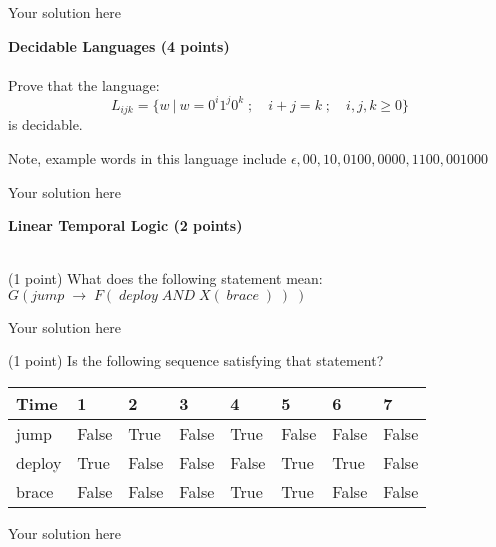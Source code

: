 \documentclass[12pt]{article}
\newenvironment{question}[2][Question]{\begin{trivlist}
\item[\hskip \labelsep {\bfseries #1}\hskip \labelsep {\bfseries #2.}]}{\end{trivlist}}
\newenvironment{solution}[1][Solution:]{\begin{trivlist}
\item[\hskip \labelsep {\bfseries #1}\hskip \labelsep {\bfseries}]\color{blue}}{\end{trivlist}}
\begin{document}
  \begin{solution}
 \;
 
 Your solution here
  \end{solution}

\clearpage
\begin{question}{10}\textbf{Decidable Languages (4 points)} \\\\
Prove that the language: \[L_{ijk} = \{w \ | \ w = 0^i1^j0^k \; ; \quad i+j = k \; ; \quad i,j,k \geq 0 \} \] is decidable.

Note, example words in this language include $\epsilon, 00, 10, 0100, 0000, 1100, 001000$
\end{question}

\begin{solution}
\;
Your solution here    
\end{solution}


\clearpage
\begin{question}{BONUS}\textbf{Linear Temporal Logic (2 points)} \\\\

\begin{itemize}
    \item (1 point) What does the following statement mean: \\
    $G(jump \; \rightarrow \; F ( \;deploy\; AND\; X( \;brace\; )\;   )\; )$

\begin{solution}
\;
Your solution here    
\end{solution}

\bigskip
    
    \item (1 point) Is the following sequence satisfying that statement?\\

\begin{table}[h!]
\begin{tabular}{|l|l|l|l|l|l|l|l|}
\hline
Time   & 1     & 2     & 3     & 4     & 5     & 6     & 7     \\ \hline
jump   & False & True  & False & True  & False & False & False \\ \hline
deploy & True  & False & False & False & True  & True  & False \\ \hline
brace  & False & False & False & True  & True  & False & False \\ \hline
\end{tabular}
\end{table}    

\begin{solution}
\;
Your solution here    
\end{solution}
    
\end{itemize}

\end{question}
\end{document}
